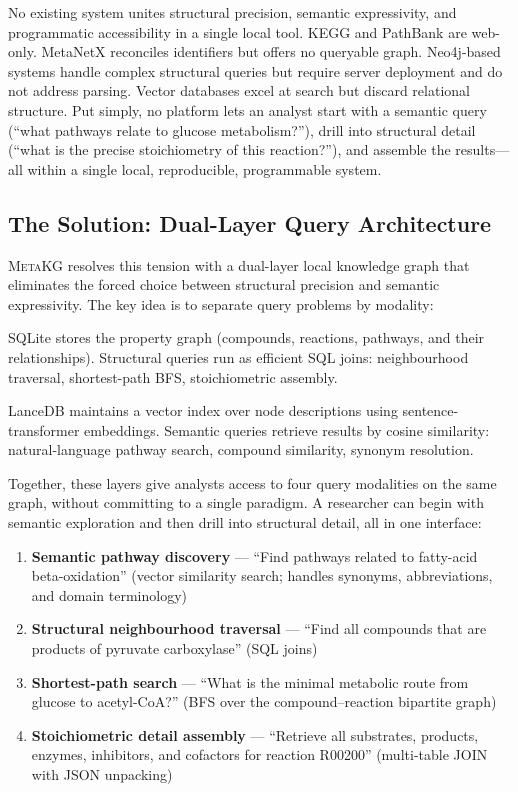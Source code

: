 \documentclass[10pt]{article}
\begin{document}
No existing system unites structural precision, semantic expressivity, and
programmatic accessibility in a single local tool. KEGG and PathBank are
web-only. MetaNetX reconciles identifiers but offers no queryable graph.
Neo4j-based systems handle complex structural queries but require server
deployment and do not address parsing. Vector databases excel at search but
discard relational structure. Put simply, no platform lets an analyst start
with a semantic query (``what pathways relate to glucose metabolism?''), drill
into structural detail (``what is the precise stoichiometry of this
reaction?''), and assemble the results---all within a single local,
reproducible, programmable system.

\subsection{The Solution: Dual-Layer Query Architecture}

\textsc{MetaKG} resolves this tension with a dual-layer local knowledge graph
that eliminates the forced choice between structural precision and semantic
expressivity. The key idea is to separate query problems by modality:

\begin{description}[leftmargin=*,itemsep=2pt]
\item[Structural layer.] SQLite stores the property graph (compounds,
  reactions, pathways, and their relationships). Structural queries run as
  efficient SQL joins: neighbourhood traversal, shortest-path BFS,
  stoichiometric assembly.
\item[Semantic layer.] LanceDB maintains a vector index over node descriptions
  using sentence-transformer embeddings. Semantic queries retrieve results by
  cosine similarity: natural-language pathway search, compound similarity,
  synonym resolution.
\end{description}

Together, these layers give analysts access to four query modalities on the
same graph, without committing to a single paradigm. A researcher can begin
with semantic exploration and then drill into structural detail, all in one
interface:

\begin{enumerate}[leftmargin=*, itemsep=2pt]
\item \textbf{Semantic pathway discovery} --- ``Find pathways related to
  fatty-acid beta-oxidation'' (vector similarity search; handles synonyms,
  abbreviations, and domain terminology)
\item \textbf{Structural neighbourhood traversal} --- ``Find all compounds
  that are products of pyruvate carboxylase'' (SQL joins)
\item \textbf{Shortest-path search} --- ``What is the minimal metabolic route
  from glucose to acetyl-CoA?'' (BFS over the compound--reaction bipartite
  graph)
\item \textbf{Stoichiometric detail assembly} --- ``Retrieve all substrates,
  products, enzymes, inhibitors, and cofactors for reaction R00200''
  (multi-table JOIN with JSON unpacking)
\end{enumerate}
\end{document}
